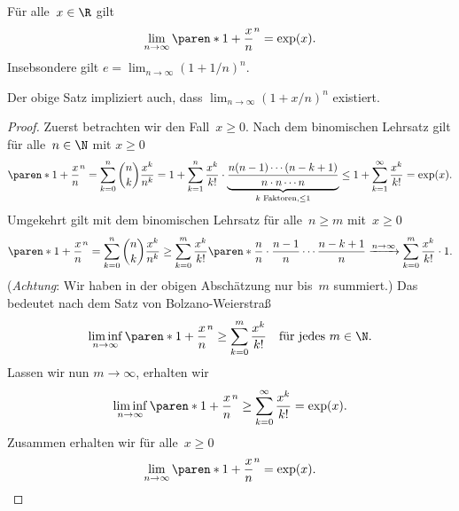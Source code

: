 \documentclass[a4paper]{article}
\begin{document}
\begin{theorem}
    Für alle~$x \in \R$ gilt
    \begin{equation*}
        \lim_{n\to\infty} \paren*{1+\frac{x}{n}}^n = \exp(x).
    \end{equation*}
    Insebsondere gilt $e = \lim_{n\to\infty} (1+1/n)^n$.
\end{theorem}

Der obige Satz impliziert auch, dass $\lim_{n\to\infty} (1+x/n)^n$ existiert.

\begin{proof}
    Zuerst betrachten wir den Fall~$x \geq 0$. Nach dem binomischen Lehrsatz gilt für alle~$n \in \N$ mit $x \geq 0$
    \begin{equation*}
        \paren*{1+\frac{x}{n}}^n = \sum_{k=0}^n \binom{n}{k} \frac{x^k}{n^k} = 1 + \sum_{k=1}^n \frac{x^k}{k!} \cdot \underbrace{\frac{n(n-1)\cdots(n-k+1)}{n\cdot n\cdots n}}_{k\text{ Faktoren}, \leq 1} \leq 1 + \sum_{k=1}^\infty \frac{x^k}{k!} = \exp(x).
    \end{equation*}
    Umgekehrt gilt mit dem binomischen Lehrsatz für alle~$n \geq m$ mit~$x \geq 0$
    \begin{equation*}
        \paren*{1+\frac{x}{n}}^n = \sum_{k=0}^n \binom{n}{k} \frac{x^k}{n^k} \geq \sum_{k=0}^m \frac{x^k}{k!} \paren*{\frac{n}{n}\cdot\frac{n-1}{n}\cdots\frac{n-k+1}{n}} \xrightarrow{n\to\infty} \sum_{k=0}^m \frac{x^k}{k!} \cdot 1.
    \end{equation*}
    (\emph{Achtung}: Wir haben in der obigen Abschätzung nur bis~$m$ summiert.) Das bedeutet nach dem Satz von Bolzano-Weierstraß
    \begin{equation*}
        \liminf_{n\to\infty} \paren*{1+\frac{x}{n}}^n \geq \sum_{k=0}^m \frac{x^k}{k!} \quad\text{für jedes } m \in \N.
    \end{equation*}
    Lassen wir nun $m \to \infty$, erhalten wir
    \begin{equation*}
        \liminf_{n\to\infty} \paren*{1+\frac{x}{n}}^n \geq \sum_{k=0}^\infty \frac{x^k}{k!} = \exp(x).
    \end{equation*}
    Zusammen erhalten wir für alle~$x \geq 0$
    \begin{equation*}
        \lim_{n\to\infty} \paren*{1+\frac{x}{n}}^n = \exp(x).
    \end{equation*}


\end{proof}
\end{document}
